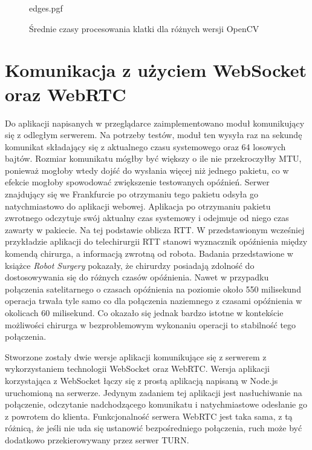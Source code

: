 \documentclass[language=polish,type=master]{aghmodern}
\begin{document}
\begin{figure}[H]
    \centering
    {edges.pgf}
    \caption{Średnie czasy procesowania klatki dla różnych wersji OpenCV}
    \label{fig:edges}
\end{figure}

\section{Komunikacja z użyciem WebSocket oraz WebRTC}
Do aplikacji napisanych w przeglądarce zaimplementowano moduł komunikujący się z odległym serwerem.
Na potrzeby testów, moduł ten wysyła raz na sekundę komunikat składający się z aktualnego czasu systemowego oraz 64 losowych bajtów.
Rozmiar komunikatu mógłby być większy o ile nie przekroczyłby MTU\footnotemark{}, ponieważ mogłoby wtedy dojść do wysłania więcej niż jednego pakietu, co w efekcie mogłoby spowodować zwiększenie testowanych opóźnień.
Serwer znajdujący się we Frankfurcie po otrzymaniu tego pakietu odsyła go natychmiastowo do aplikacji webowej.
Aplikacja po otrzymaniu pakietu zwrotnego odczytuje swój aktualny czas systemowy i odejmuje od niego czas zawarty w pakiecie.
Na tej podstawie oblicza RTT\footnotemark{}.
W przedstawionym wcześniej przykładzie aplikacji do telechirurgii RTT stanowi wyznacznik opóźnienia między komendą chirurga, a informacją zwrotną od robota.
Badania przedstawione w książce \emph{Robot Surgery} \cite{telesurgery} pokazały, że chirurdzy posiadają zdolność do dostosowywania się do różnych czasów opóźnienia.
Nawet w przypadku połączenia satelitarnego o czasach opóźnienia na poziomie około 550 milisekund operacja trwała tyle samo co dla połączenia naziemnego z czasami opóźnienia w okolicach 60 milisekund.
Co okazało się jednak bardzo istotne w kontekście możliwości chirurga w bezproblemowym wykonaniu operacji to stabilność tego połączenia.

Stworzone zostały dwie wersje aplikacji komunikujące się z serwerem z wykorzystaniem technologii WebSocket oraz WebRTC.
Wersja aplikacji korzystająca z WebSocket łączy się z prostą aplikacją napisaną w Node.js\footnotemark{} uruchomioną na serwerze.
Jedynym zadaniem tej aplikacji jest nasłuchiwanie na połączenie, odczytanie nadchodzącego komunikatu i natychmiastowe odesłanie go z powrotem do klienta.
Funkcjonalność serwera WebRTC jest taka sama, z tą różnicą, że jeśli nie uda się ustanowić bezpośredniego połączenia, ruch może być dodatkowo przekierowywany przez serwer TURN.
\end{document}
